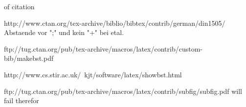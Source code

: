 
of citation

http://www.ctan.org/tex-archive/biblio/bibtex/contrib/german/din1505/
%
%
%
%
Abstaende vor ";" und kein "+" bei etal.

ftp://tug.ctan.org/pub/tex-archive/macros/latex/contrib/custom-bib/makebst.pdf


http://www.cs.stir.ac.uk/~kjt/software/latex/showbst.html




\usepackage{float} %

\usepackage{flafter} %

\usepackage[
section %
]{placeins}
%
ftp://tug.ctan.org/pub/tex-archive/macros/latex/contrib/subfig/subfig.pdf
will fail therefor
\usepackage{subfig} %

